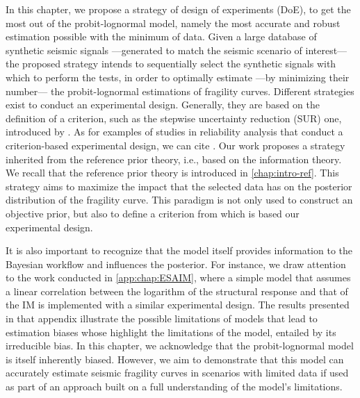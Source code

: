 




In this chapter, we propose a strategy of design of experiments (DoE), to get the most out of the probit-lognormal model, namely the most accurate and robust estimation possible with the minimum of data. Given a large database of synthetic seismic signals ---generated to match the seismic scenario of interest--- the proposed strategy intends to sequentially select the synthetic signals with which to perform 
the tests, in order to optimally estimate ---by minimizing their number--- the probit-lognormal estimations of fragility curves. 
Different strategies exist to conduct an experimental design. Generally, they are based on the definition of a criterion, such as the stepwise uncertainty reduction (SUR) one, introduced by \citet{villemonteix_informational_2009}. 
As for examples of studies in reliability analysis that conduct a criterion-based experimental design, we can cite \cite{bect_supermartingale_2019,azzimonti_adaptive_2021,agrell_sequential_2021,lartaud_sequential_2025}.
Our work proposes a strategy inherited from the reference prior theory, i.e., based on the information theory. We recall that the reference prior theory is introduced in \cref{chap:intro-ref}. This strategy aims to maximize the impact that the selected data has on the posterior distribution of the fragility curve. 
This paradigm is not only used to construct an objective prior, %
but also to define a criterion from which is based our experimental design.





It is also important to recognize that the model itself provides information to the Bayesian workflow and influences the posterior.
For instance, 
we draw attention to the work conducted in \cref{app:chap:ESAIM}, where a simple model that assumes a linear correlation between the logarithm of the structural response and that of the IM is implemented with a similar experimental design. 
The results presented in that appendix illustrate the possible limitations of models that lead to estimation biases whose  highlight the limitations of the model,  entailed by its irreducible bias. %
In this chapter, we acknowledge that the probit-lognormal model %
is itself inherently biased. However, we aim to demonstrate that this model can accurately estimate seismic fragility curves in scenarios with limited data if used as part of an approach built on a full understanding of the model's limitations.
%



